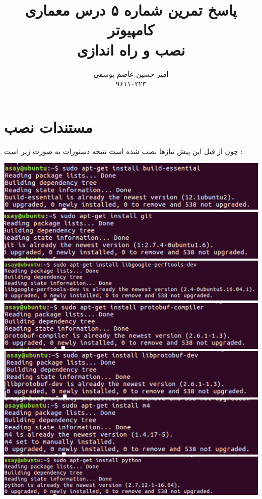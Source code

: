 \documentclass{article}
\title{پاسخ تمرین شماره ۵ درس معماری کامپیوتر 
	\\
	نصب و راه اندازی
	\textcolor{red}{\lr{gem5}}}
\author{امیر حسین عاصم یوسفی \\ ۹۶۱۱۰۳۲۳}
\begin{document}
	\maketitle
	\section*{مستندات نصب  }
	چون از قبل این پیش نیازها نصب شده است نتیجه دستورات به صورت زیر است  : 
		\begin{center}
		\includegraphics[width=1\textwidth]{essential}
				\includegraphics[width=1\textwidth]{git}
						\includegraphics[width=1\textwidth]{libgoogle-proftools}
						\includegraphics[width=1\textwidth]{libprotobuf-compiler}
							\includegraphics[width=1\textwidth]{libprotobuf-dev}
							\includegraphics[width=1\textwidth]{m4}
							\includegraphics[width=1\textwidth]{python}

\end{center}
\end{document}
